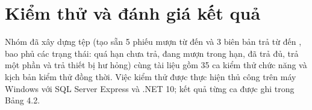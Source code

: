 
\section{Kiểm thử và đánh giá kết quả}

Nhóm đã xây dựng tệp  (tạo sẵn 5 phiếu mượn từ  đến  và 3 biên bản trả từ  đến , bao phủ các trạng thái: quá hạn chưa trả, đang mượn trong hạn, đã trả đủ, trả một phần và trả thiết bị hư hỏng) cùng tài liệu  gồm 35 ca kiểm thử chức năng và kịch bản kiểm thử đồng thời. Việc kiểm thử được thực hiện thủ công trên máy Windows với SQL Server Express và .NET 10; kết quả từng ca được ghi trong Bảng 4.2.

